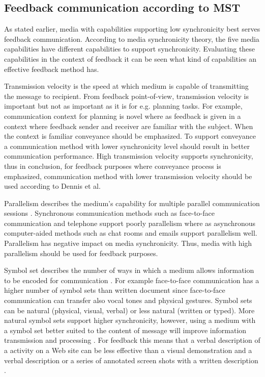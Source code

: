 \documentclass[conference]{IEEEtran}
\begin{document}
\subsection{Feedback communication according to MST}

As stated earlier, media with capabilities supporting low synchronicity best serves feedback communication. According to media synchronicity theory, the five media capabilities have different capabilities to support synchronicity. Evaluating these capabilities in the context of feedback it can be seen what kind of capabilities an effective feedback method has.

Transmission velocity is the speed at which medium is capable of transmitting the message to recipient. From feedback point-of-view, transmission velocity is important but not as important as it is for e.g. planning tasks. For example, communication context for planning is novel where as feedback is given in a context where feedback sender and receiver are familiar with the subject. When the context is familiar conveyance should be emphasized. To support conveyance a communication method with lower synchronicity level should result in better communication performance. High transmission velocity supports synchronicity, thus in conclusion, for feedback purposes where conveyance process is emphasized, communication method with lower transmission velocity should be used according to Dennis et al. \cite{2008dennis}

Parallelism describes the medium's capability for multiple parallel communication sessions \cite{2008dennis}. Synchronous communication methods such as face-to-face communication and telephone support poorly parallelism where as asynchronous computer-aided methods such as chat rooms and emails support parallelism well. Parallelism has negative impact on media synchronicity. Thus, media with high parallelism should be used for feedback purposes. \cite{2008dennis}

Symbol set describes the number of ways in which a medium allows information to be encoded for communication \cite{2008dennis}. For example face-to-face communication has a higher number of symbol sets than written document since face-to-face communication can transfer also vocal tones and physical gestures. Symbol sets can be natural (physical, visual, verbal) or less natural (written or typed). More natural symbol sets support higher synchronicity, however, using a medium with a symbol set better suited to the content of message will improve information transmission and processing \cite{2008dennis}. For feedback this means that a verbal description of a activity on a Web site can be less effective than a visual demonstration and a verbal description or a series of annotated screen shots with a written description \cite{2008dennis}.
\end{document}
